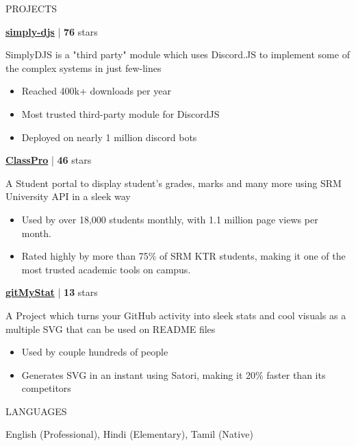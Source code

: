 \documentclass{resume}
\begin{document}
\begin{rSection}{PROJECTS}    
    \item \textbf{\href{https://github.com/Rahuletto/simply-djs}{simply-djs}} | \textbf{76} stars

SimplyDJS is a "third party" module which uses Discord.JS to implement some of the complex
systems in just few-lines

\begin{itemize}
\item Reached 400k+ downloads per year
\item Most trusted third-party module for DiscordJS
\item Deployed on nearly 1 million discord bots
\end{itemize}
\item \textbf{\href{https://github.com/Rahuletto/ClassPro}{ClassPro}} | \textbf{46} stars

A Student portal to display student's grades, marks and many more using SRM University API in a sleek way

\begin{itemize}
\item Used by over 18,000 students monthly, with 1.1 million page views per month.
\item Rated highly by more than 75\% of SRM KTR students, making it one of the most trusted academic tools on campus.
\end{itemize}
\item \textbf{\href{https://github.com/Rahuletto/gitMyStat}{gitMyStat}} | \textbf{13} stars

A Project which turns your GitHub activity into sleek stats and cool visuals as a multiple SVG that can be used on README files

\begin{itemize}
\item Used by couple hundreds of people
\item Generates SVG in an instant using Satori, making it 20\% faster than its competitors
\end{itemize}

\end{rSection}
\vspace{1.5em}


\begin{rSection}{LANGUAGES}

\begin{itemize}
    English (Professional), Hindi (Elementary), Tamil (Native)
\end{itemize}

\end{rSection}
\end{document}
